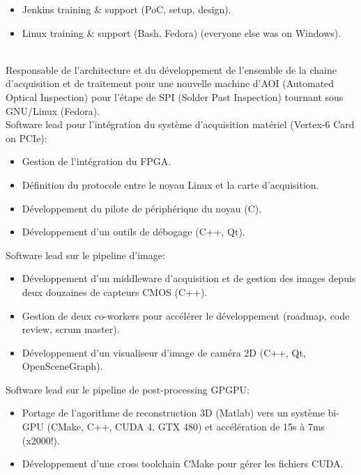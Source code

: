 \documentclass{resume}
\begin{document}
{\begin{itemize}
  	\item Jenkins training \& support (PoC, setup, design).
  	\item Linux training \& support (Bash, Fedora) (everyone else was on Windows).
  \end{itemize}
} {
   \\
  Responsable de l'architecture et du d\'{e}veloppement de l'ensemble de la chaine d'acquisition et de traitement
  pour une nouvelle machine d'AOI (Automated Optical Inspection) pour l'\'{e}tape de SPI (Solder Past Inspection)
  tournant sous GNU/Linux (Fedora).\\
  Software lead pour l'int\'{e}gration du syst\`{e}me d'acquisition mat\'{e}riel (Vertex-6 Card on PCIe):\\
  \begin{itemize}
  	\item Gestion de l'int\'{e}gration du FPGA.
  	\item D\'{e}finition du protocole entre le noyau Linux et la carte d'acquisition.
  	\item D\'{e}veloppement du pilote de p\'{e}riph\'{e}rique du noyau (C).
  	\item D\'{e}veloppement d'un outils de d\'{e}bogage (C++, Qt).
  \end{itemize}
  Software lead sur le pipeline d'image:\\
  \begin{itemize}
  	\item D\'{e}veloppement d'un middleware d'acquisition et de gestion des
  		images depuis deux douzaines de capteurs CMOS (C++).
  	\item Gestion de deux co-workers pour acc\'{e}l\'{e}rer le d\'{e}veloppement (roadmap, code review, scrum master).
  	\item D\'{e}veloppement d'un visualiseur d'image de cam\'{e}ra 2D (C++, Qt, OpenSceneGraph).
  \end{itemize}
  Software lead sur le pipeline de post-processing GPGPU:\\
  \begin{itemize}
  	\item Portage de l'agorithme de reconstruction 3D (Matlab) vers un syst\`{e}me bi-GPU (CMake, C++, CUDA 4, GTX 480)
  		et acc\'{e}l\'{e}ration de 15s \`{a} 7ms (x2000!).
  	\item D\'{e}veloppement d'une cross toolchain CMake pour g\'{e}rer les fichiers CUDA.

\end{itemize}}
\end{document}
